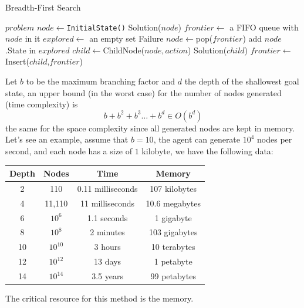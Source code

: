 \documentclass[10pt, letterpaper]{report}
\begin{document}
\begin{algorithm}
    \caption{Breadth-First Search}\label{alg:BFS}
    \begin{algorithmic}
    \Require $problem$
    \State $node\leftarrow$\texttt{InitialState()}
    \State\Return Solution($node$)
    \EndIf
    \State $frontier\leftarrow$ a FIFO queue with $node$ in it
    \State $explored\leftarrow$ an empty set
    \State\Return Failure
    \EndIf
    \State $node\leftarrow$pop($frontier$)
    \State add $node$.State in $explored$
    \State $child\leftarrow$ChildNode($node,action$)
    \State\Return Solution($child$)
    \EndIf
    \State $frontier\leftarrow$Insert($child$,$frontier$)
    \EndIf
    \EndFor
    \EndWhile
    \end{algorithmic}
\end{algorithm}
Let $b$ to be the maximum branching factor and $d$ the depth of the shallowest goal state, an upper bound (in the worst case) for the number of nodes generated (time complexity) is\begin{equation}
    b+b^2+b^3\dots +b^d\in O(b^d)
\end{equation}
the same for the space complexity since  all generated nodes are kept in memory. Let's see an example, assume that $b=10$, the agent can generate $10^4$ nodes per second, and each node has a size of $1$ kilobyte, we have the following data:\begin{center}
    \begin{tabular}{|c|c|c|c|}
        \hline
        \textbf{Depth} & \textbf{Nodes} & \textbf{Time} & \textbf{Memory} \\
        \hline
        2 & 110 & 0.11 milliseconds & 107 kilobytes \\
        \hline
        4 & 11,110 & 11 milliseconds & 10.6 megabytes \\
        \hline
        6 & $10^6$ & 1.1 seconds & 1 gigabyte \\
        \hline
        8 & $10^8$ & 2 minutes & 103 gigabytes \\
        \hline
        10 & $10^{10}$ & 3 hours & 10 terabytes \\
        \hline
        12 & $10^{12}$ & 13 days & 1 petabyte \\
        \hline
        14 & $10^{14}$ & 3.5 years & 99 petabytes \\
        \hline
    \end{tabular}
\end{center}
The critical resource for this method is the memory.
\end{document}
